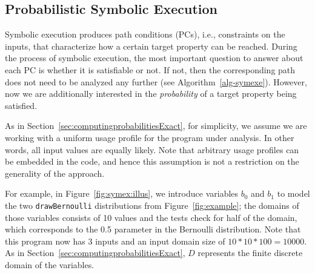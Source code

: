 \subsection{Probabilistic Symbolic Execution}
\label{sec:pse}

Symbolic execution produces path conditions (PCs), i.e., constraints on the inputs, that characterize how a certain target property can be reached. During the process of symbolic execution, the most important question to answer about each PC is whether it is satisfiable or not.  If not, then the corresponding path does not need to be analyzed any further (see Algorithm~\ref{alg-symexe}).  However, now we are additionally interested in the \emph{probability} of a target property being satisfied. 

As in Section~\ref{sec:computingprobabilitiesExact}, for simplicity, we assume we are working with a uniform usage profile for the program under analysis.  In other words, all input values are equally likely.  Note that arbitrary usage profiles can be embedded in the code, and hence this assumption is not a restriction on the generality of the approach. 

For example, in Figure~\ref{fig:symex:illus}, 
we introduce variables $b_0$ and $b_1$ to model 
the two {\tt drawBernoulli} distributions from Figure~\ref{fig:example};
the domains of those variables consists of 10 values and the tests
check for half of the domain, which corresponds to the 0.5 parameter
in the Bernoulli distribution.
Note that this program now has 3 inputs and an input domain size of
$10 * 10 * 100 = 10000$.
As in Section~\ref{sec:computingprobabilitiesExact}, $D$ represents the finite discrete domain of the variables.

